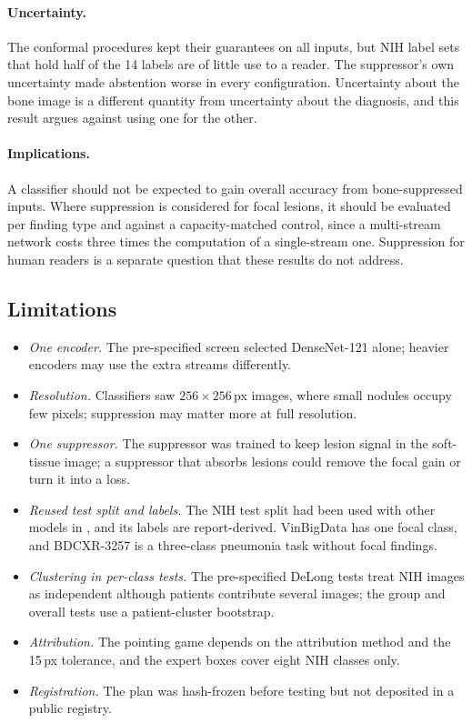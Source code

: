 \paragraph{Uncertainty.} The conformal procedures kept their guarantees on all inputs, but NIH label sets that hold half of the 14 labels
are of little use to a reader. The suppressor's own uncertainty made abstention worse in every configuration. Uncertainty about the bone image is a different quantity from uncertainty about the diagnosis, and this result argues
against using one for the other.

\paragraph{Implications.} A classifier should not be expected to gain overall accuracy from bone-suppressed inputs. Where suppression is
considered for focal lesions, it should be evaluated per finding type and against a capacity-matched control, since a multi-stream network
costs three times the computation of a single-stream one. Suppression for human readers is a separate question that these results do not
address.

\subsection{Limitations}
\label{sec:cls_limits}
\begin{itemize}
\item \emph{One encoder.} The pre-specified screen selected DenseNet-121 alone; heavier encoders may use the extra streams differently.
\item \emph{Resolution.} Classifiers saw $256\times256$\,px images, where small nodules occupy few pixels; suppression may matter more at
  full resolution.
\item \emph{One suppressor.} The suppressor was trained to keep lesion signal in the soft-tissue image; a suppressor that absorbs lesions
  could remove the focal gain or turn it into a loss.
\item \emph{Reused test split and labels.} The NIH test split had been used with other models in , and its labels are
  report-derived. VinBigData has one focal class, and BDCXR-3257 is a three-class pneumonia task without focal findings.
\item \emph{Clustering in per-class tests.} The pre-specified DeLong tests treat NIH images as independent although patients contribute
  several images; the group and overall tests use a patient-cluster bootstrap.
\item \emph{Attribution.} The pointing game depends on the attribution method and the 15\,px tolerance, and the expert boxes cover eight
  NIH classes only.
\item \emph{Registration.} The plan was hash-frozen before testing but not deposited in a public registry.
\end{itemize}

